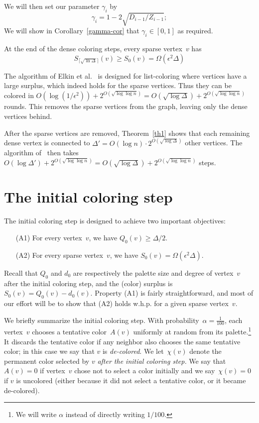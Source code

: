 \documentclass[11pt]{amsart}
\begin{document}
We will then set our parameter $\gamma_i$ by
$$
\gamma_i = 1 - 2 \sqrt{D_{i-1}/Z_{i-1}};
$$
We will show in Corollary~\ref{gamma-cor} that $\gamma_i \in [0,1]$ as required.
 
At the end of the dense coloring steps, every sparse vertex~$v$ has
$$
S_{\lceil \sqrt{\ln \Delta} \rceil} (v) \geq S_0(v) = \Omega(\epsilon^2 \Delta)
$$

The algorithm of Elkin et al.~\cite{elk15} is designed for list-coloring where vertices have a large surplus, which indeed holds for the sparse vertices. Thus they can be colored in $O( \log(1/\epsilon^2)) + 2^{O(\sqrt{\log \log n})} = O( {\sqrt{\log \Delta}}) + 2^{O(\sqrt{\log \log n})}$ rounds. This removes the sparse vertices from the graph, leaving only the dense vertices behind.

After the sparse vertices are removed, Theorem~\ref{th1} shows that each remaining dense vertex is connected to $\Delta' = O(\log n) \cdot 2^{O(\sqrt{\log \Delta})}$ other vertices. The algorithm of~\cite{BEPS16} then takes $O(\log \Delta') + 2^{O(\sqrt{\log \log n})} = O(\sqrt{\log \Delta}) + 2^{O(\sqrt{\log \log n})}$ steps.

\section{The initial coloring step}
\label{sec:firstcoloring}
The initial coloring step is designed to achieve two important objectives:
\begin{enumerate}
\item[(A1)] For every vertex~$v$, we have $Q_0(v) \geq \Delta/2$.
\item[(A2)] For every sparse vertex~$v$, we have $S_0(v) =  \Omega(\epsilon^2 \Delta)$.
\end{enumerate}
Recall that $Q_0$ and $d_0$ are respectively the palette size and degree of vertex~$v$ after the initial coloring step, and the (color) surplus is $S_0(v) = Q_0(v) - d_0(v)$. Property (A1) is fairly straightforward, and most of our effort will be to show that (A2) holds w.h.p. for a given sparse vertex~$v$.

We briefly summarize the initial coloring step. With probability~$\alpha = \tfrac{1}{100}$, each vertex~$v$ chooses a tentative color~$A(v)$ uniformly at random from its palette.\footnote{We will write $\alpha$ instead of directly writing $1/100$.} It discards the tentative color if any neighbor also chooses the same tentative color; in this case we say that $v$ is \emph{de-colored}. We let~$\chi(v)$ denote the permanent color selected by $v$ \emph{after the initial coloring step.} We say that $A(v)= 0$ if vertex~$v$ chose not to select a color initially and we say~$\chi(v)=0$ if $v$ is uncolored (either because it did not select a tentative color, or it became de-colored).
\end{document}
